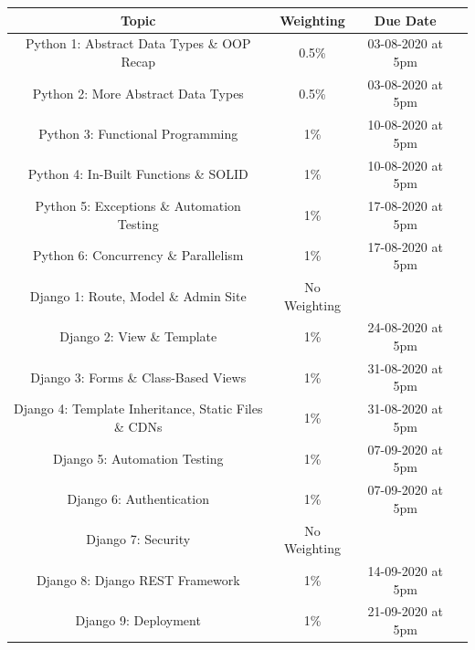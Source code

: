 \documentclass{article}
\begin{document}
\renewcommand{\arraystretch}{1.5}
\begin{tabular}{|c|c|c|c|}
	\hline
	\textbf{Topic}                                              & \textbf{Weighting}  & \textbf{Due Date} \\ \hline 
	\small Python 1: Abstract Data Types \& OOP Recap           & \small 0.5\%        & \small 03-08-2020 at 5pm \\ \hline
	\small Python 2: More Abstract Data Types                   & \small 0.5\%        & \small 03-08-2020 at 5pm \\ \hline
	\small Python 3: Functional Programming                     & \small 1\%          & \small 10-08-2020 at 5pm \\ \hline
	\small Python 4: In-Built Functions \& SOLID                & \small 1\%          & \small 10-08-2020 at 5pm \\ \hline
	\small Python 5: Exceptions \& Automation Testing           & \small 1\%          & \small 17-08-2020 at 5pm \\ \hline
	\small Python 6: Concurrency \& Parallelism                 & \small 1\%          & \small 17-08-2020 at 5pm \\ \hline
	\small Django 1: Route, Model \& Admin Site                 & \small No Weighting &  \\ \hline
	\small Django 2: View \& Template                           & \small 1\%          & \small 24-08-2020 at 5pm \\ \hline
	\small Django 3: Forms \& Class-Based Views                 & \small 1\%          & \small 31-08-2020 at 5pm \\ \hline
	\small Django 4: Template Inheritance, Static Files \& CDNs & \small 1\%          & \small 31-08-2020 at 5pm \\ \hline
	\small Django 5: Automation Testing                         & \small 1\%          & \small 07-09-2020 at 5pm \\ \hline
	\small Django 6: Authentication                             & \small 1\%          & \small 07-09-2020 at 5pm \\ \hline
	\small Django 7: Security                                   & \small No Weighting & \\ \hline
	\small Django 8: Django REST Framework           & \small 1\%          & \small 14-09-2020 at 5pm \\ \hline
	\small Django 9: Deployment                                 & \small 1\%          & \small 21-09-2020 at 5pm \\ \hline

\end{tabular}
\end{document}
